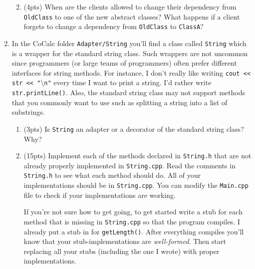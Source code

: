\documentclass[11pt]{article}
\newlength{\up}\setlength{\up}{-\baselineskip}
\begin{document}
\begin{enumerate}
\begin{enumerate}
    \vspace{1in}

    \item (4pts) When are the clients allowed to change their dependency from \texttt{OldClass} to one of the new abstract classes? What happens if a client forgets to change a dependency from \texttt{OldClass} to \texttt{ClassA}? 

    \vspace{1in}

  \end{enumerate}


\newpage


  \item In the CoCalc folder \texttt{Adapter/String} you'll find a class called \texttt{String} which is a wrapper for the standard string class. Such wrappers are not uncommon since programmers (or large teams of programmers) often prefer different interfaces for string methods. For instance, I don't really like writing \texttt{cout << str << "$\setminus$n"} every time I want to print a string. I'd rather write \texttt{str.printLine()}. Also, the standard string class may not support methods that you commonly want to use such as splitting a string into a list of substrings.

  \begin{enumerate}

    \item (3pts) Is \texttt{String} an adapter or a decorator of the standard string class? Why?

    \vspace{1in}

    \item (15pts) Implement each of the methods declared in \texttt{String.h} that are not already properly implemented in \texttt{String.cpp}. Read the comments in \texttt{String.h} to see what each method should do. All of your implementations should be in \texttt{String.cpp}. You can modify the \texttt{Main.cpp} file to check if your implementations are working. 

    If you're not sure how to get going, to get started write a stub for each method that is missing in \texttt{String.cpp} so that the program compiles. I already put a stub in for \texttt{getLength()}. After everything compiles you'll know that your stub-implementations are \emph{well-formed}. Then start replacing all your stubs (including the one I wrote) with proper implementations. 

  \end{enumerate}

\end{enumerate}
\end{document}
